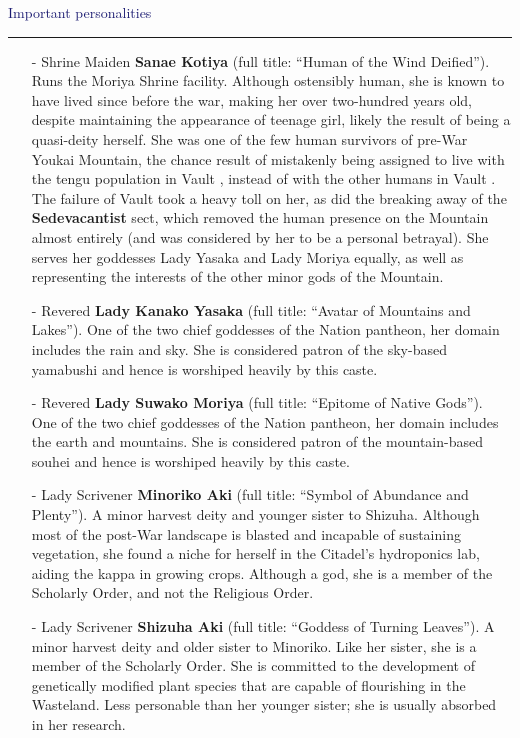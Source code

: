 \documentclass[a4paper,12pt]{book}
\newcommand{\maru}[1]{\raisebox{.5pt}{\textcircled{\raisebox{-.9pt} {#1}}}}
\newcommand{\factionheading}[1]{
\parbox{\textwidth}{
        \vspace{2mm}
        \noindent
        \textcolor{MidnightBlue}{
{\large {#1}
        \vspace*{1mm}
        \hrule}
        \vspace*{3mm}
        \noindent
} } }
\begin{document}
\factionheading{Important personalities}
\begin{itemize}
\item[-] Shrine Maiden \textbf{Sanae Kotiya} (full title: ``Human of the Wind Deified''). Runs the Moriya Shrine facility. Although ostensibly human, she is known to have lived since before the war, making her over two-hundred years old, despite maintaining the appearance of teenage girl, likely the result of being a quasi-deity herself. She was one of the few human survivors of pre-War Youkai Mountain, the chance result of mistakenly being assigned to live with the tengu population in Vault \maru{12}, instead of with the other humans in Vault \maru{13}. The failure of Vault \maru{13} took a heavy toll on her, as did the breaking away of the \textbf{Sedevacantist} sect, which removed the human presence on the Mountain almost entirely (and was considered by her to be a personal betrayal). She serves her goddesses Lady Yasaka and Lady Moriya equally, as well as representing the interests of the other minor gods of the Mountain.
\item[-] Revered \textbf{Lady Kanako Yasaka} (full title: ``Avatar of Mountains and Lakes''). One of the two chief goddesses of the Nation pantheon, her domain includes the rain and sky. She is considered patron of the sky-based yamabushi and hence is worshiped heavily by this caste.
\item[-] Revered \textbf{Lady Suwako Moriya} (full title: ``Epitome of Native Gods''). One of the two chief goddesses of the Nation pantheon, her domain includes the earth and mountains. She is considered patron of the mountain-based souhei and hence is worshiped heavily by this caste.
\item[-] Lady Scrivener \textbf{Minoriko Aki} (full title: ``Symbol of Abundance and Plenty''). A minor harvest deity and younger sister to Shizuha. Although most of the post-War landscape is blasted and incapable of sustaining vegetation, she found a niche for herself in the Citadel's hydroponics lab, aiding the kappa in growing crops. Although a god, she is a member of the Scholarly Order, and not the Religious Order.
\item[-] Lady Scrivener \textbf{Shizuha Aki} (full title: ``Goddess of Turning Leaves''). A minor harvest deity and older sister to Minoriko. Like her sister, she is a member of the Scholarly Order. She is committed to the development of genetically modified plant species that are capable of flourishing in the Wasteland. Less personable than her younger sister; she is usually absorbed in her research.

\end{itemize}
\end{document}
